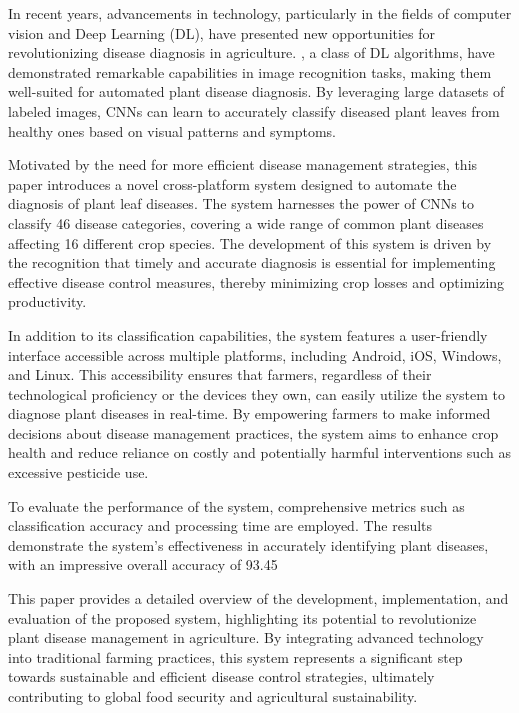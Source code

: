 \documentclass{article}
\begin{document}
In recent years, advancements in technology, particularly in the fields of computer vision and Deep Learning (DL), have presented new opportunities for revolutionizing disease diagnosis in agriculture. , a class of DL algorithms, have demonstrated remarkable capabilities in image recognition tasks, making them well-suited for automated plant disease diagnosis. By leveraging large datasets of labeled images, CNNs can learn to accurately classify diseased plant leaves from healthy ones based on visual patterns and symptoms.

Motivated by the need for more efficient disease management strategies, this paper introduces a novel cross-platform system designed to automate the diagnosis of plant leaf diseases. The system harnesses the power of CNNs to classify 46 disease categories, covering a wide range of common plant diseases affecting 16 different crop species. The development of this system is driven by the recognition that timely and accurate diagnosis is essential for implementing effective disease control measures, thereby minimizing crop losses and optimizing productivity.

In addition to its classification capabilities, the system features a user-friendly interface accessible across multiple platforms, including Android, iOS, Windows, and Linux. This accessibility ensures that farmers, regardless of their technological proficiency or the devices they own, can easily utilize the system to diagnose plant diseases in real-time. By empowering farmers to make informed decisions about disease management practices, the system aims to enhance crop health and reduce reliance on costly and potentially harmful interventions such as excessive pesticide use.

To evaluate the performance of the system, comprehensive metrics such as classification accuracy and processing time are employed. The results demonstrate the system's effectiveness in accurately identifying plant diseases, with an impressive overall accuracy of 93.45%

This paper provides a detailed overview of the development, implementation, and evaluation of the proposed system, highlighting its potential to revolutionize plant disease management in agriculture. By integrating advanced technology into traditional farming practices, this system represents a significant step towards sustainable and efficient disease control strategies, ultimately contributing to global food security and agricultural sustainability.
\end{document}
